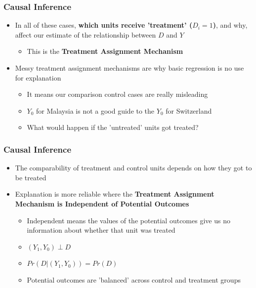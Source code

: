 \documentclass[xcolor=x11names,compress]{beamer}\usepackage[]{graphicx}\usepackage[]{color}
\renewcommand{\(}{\begin{columns}}
\renewcommand{\)}{\end{columns}}
\newcommand{\<}[1]{\begin{column}{#1}}
\renewcommand{\>}{\end{column}}
\begin{document}
\begin{frame}
\frametitle{Causal Inference}
\begin{itemize}
\item In all of these cases, \textbf{which units receive 'treatment' ($D_i=1$)}, and why, affect our estimate of the relationship between $D$ and $Y$
\pause
\begin{itemize}
\item This is the \textbf{Treatment Assignment Mechanism}
\pause
\end{itemize}
\item Messy treatment assignment mechanisms are why basic regression is no use for explanation
\pause
\begin{itemize}
\item It means our comparison control cases are really misleading
\pause
\item $Y_0$ for Malaysia is not a good guide to the $Y_0$ for Switzerland
\pause
\item What would happen if the 'untreated' units got treated?
\end{itemize}
\end{itemize}
\end{frame}


\begin{frame}
\frametitle{Causal Inference}
\begin{itemize}
\item The comparability of treatment and control units depends on how they got to be treated
\pause
\item Explanation is more reliable where the \textbf{Treatment Assignment Mechanism is Independent of Potential Outcomes}
\pause
\begin{itemize}
\item Independent means the values of the potential outcomes give us no information about whether that unit was treated
\pause
\item $(Y_1,Y_0) \perp D$
\pause
\item $Pr(D|(Y_1,Y_0)) = Pr(D)$
\pause
\item Potential outcomes are 'balanced' across control and treatment groups
\end{itemize}
\end{itemize}
\end{frame}
\end{document}
